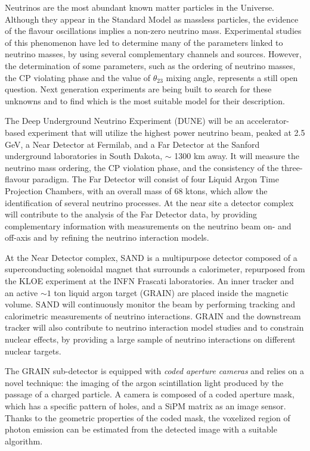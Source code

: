 Neutrinos are the most abundant known matter particles in the Universe. Although they appear in the Standard Model as massless particles, the evidence of the flavour oscillations implies a non-zero neutrino mass. Experimental studies of this phenomenon have led to determine many of the parameters linked to neutrino masses, by using several complementary channels and sources. However, the determination of some parameters, such as the ordering of neutrino masses, the CP violating phase and the value of $\theta_{23}$ mixing angle, represents a still open question. Next generation experiments are being built to search for these unknowns and to find which is the most suitable model for their description.

The Deep Underground Neutrino Experiment (DUNE) will be an accelerator-based experiment that will utilize the highest power neutrino beam, peaked at 2.5 GeV, a Near Detector at Fermilab, and a Far Detector at the Sanford underground laboratories in South Dakota, $\sim$ 1300 km away. It will measure the neutrino mass ordering, the CP violation phase, and the consistency of the three-flavour paradigm.
The Far Detector will consist of four Liquid Argon Time Projection Chambers, with an overall mass of 68 ktons, which allow the identification of several neutrino processes. At the near site a detector complex will contribute to the analysis of the Far Detector data, by providing complementary information with measurements on the neutrino beam on- and off-axis and by refining the neutrino interaction models.

At the Near Detector complex, SAND is a multipurpose detector composed of a superconducting solenoidal magnet that surrounds a calorimeter, repurposed from the KLOE experiment at the INFN Frascati laboratories. An inner tracker and an active $\sim 1$ ton liquid argon target (GRAIN) are placed inside the magnetic volume. SAND will continuously monitor the beam by performing tracking and calorimetric measurements of neutrino interactions. GRAIN and the downstream tracker will also contribute to neutrino interaction model studies and to constrain nuclear effects, by providing a large sample of neutrino interactions on different nuclear targets.

The GRAIN sub-detector is equipped with \emph{coded aperture cameras} and relies on a novel technique: the imaging of the argon scintillation light produced by the passage of a charged particle. A camera is composed of a coded aperture mask, which has a specific pattern of holes, and a SiPM matrix as an image sensor. Thanks to the geometric properties of the coded mask, the voxelized region of photon emission can be estimated from the detected image with a suitable algorithm. 

